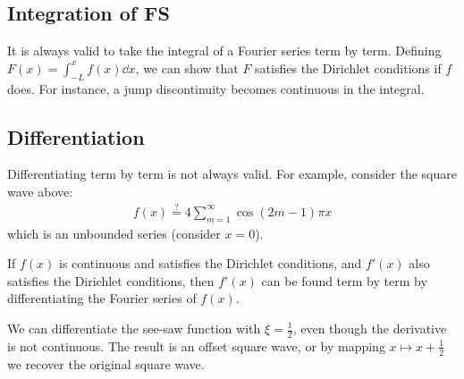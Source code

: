     \subsection{Integration of FS}
    It is always valid to take the integral of a Fourier series term by term.
    Defining $F(x) = \int_{-L}^x f(x) \dd{x}$, we can show that $F$ satisfies the Dirichlet conditions if $f$ does.
    For instance, a jump discontinuity becomes continuous in the integral.

    \subsection{Differentiation}
    Differentiating term by term is not always valid.
    For example, consider the square wave above:
    \begin{align*}
        f(x) \stackrel{?}{=} 4 \sum_{m=1}^\infty \cos (2m-1)\pi x
    \end{align*}
    which is an unbounded series (consider $x = 0$).
    \begin{theorem}
        If $f(x)$ is continuous and satisfies the Dirichlet conditions, and $f'(x)$ also satisfies the Dirichlet conditions, then $f'(x)$ can be found term by term by differentiating the Fourier series of $f(x)$.
    \end{theorem}
    \begin{example}
        We can differentiate the see-saw function with $\xi = \frac{1}{2}$, even though the derivative is not continuous.
        The result is an offset square wave, or by mapping $x \mapsto x + \frac{1}{2}$ we recover the original square wave.
    \end{example}

